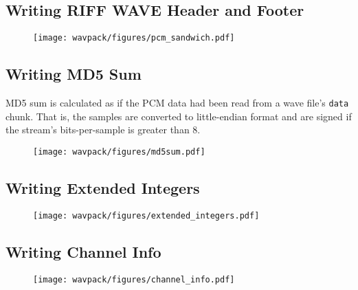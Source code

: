 \clearpage



\clearpage



\clearpage



\clearpage



\clearpage



\clearpage



\clearpage

\subsection{Writing RIFF WAVE Header and Footer}
\label{wavpack:write_wave_header}
\begin{figure}[h]
  \texttt{[image: wavpack/figures/pcm\_sandwich.pdf]}
\end{figure}


\subsection{Writing MD5 Sum}
\label{wavpack:write_md5}
MD5 sum is calculated as if the PCM data had been read from
a wave file's \texttt{data} chunk.
That is, the samples are converted to little-endian format
and are signed if the stream's bits-per-sample is greater than 8.
\begin{figure}[h]
  \texttt{[image: wavpack/figures/md5sum.pdf]}
\end{figure}

\subsection{Writing Extended Integers}
\label{wavpack:write_extended_integers}
\begin{figure}[h]
  \texttt{[image: wavpack/figures/extended\_integers.pdf]}
\end{figure}

\clearpage

\subsection{Writing Channel Info}
\label{wavpack:write_channel_info}
\begin{figure}[h]
  \texttt{[image: wavpack/figures/channel\_info.pdf]}
\end{figure}


